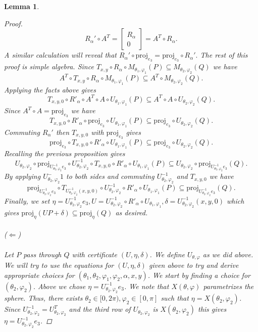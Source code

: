 \documentclass[a4paper]{amsart}
\newtheorem{lem}[thm]{Lemma}
\renewcommand{\phi}{\varphi}
\theoremstyle{remark}
\begin{document}
\begin{lem}
\begin{proof}
$$R_\alpha '\circ A^T=\begin{bmatrix} R_\alpha \\ 0\end{bmatrix}=A^T\circ R_\alpha.$$
A similar calculation will reveal that $R_\alpha'\circ \textrm{proj}_{e_3}=\textrm{proj}_{e_3}\circ R_\alpha'.$
The rest of this proof is simple algebra. Since $T_{x,y}\circ R_\alpha\circ M_{\theta_1,\phi_1}(P)\subseteq M_{\theta_2,\phi_2}(Q)$ we have $$A^T\circ T_{x,y}\circ R_\alpha\circ M_{\theta_1,\phi_1}(P)\subseteq A^T\circ M_{\theta_2,\phi_2}(Q).$$ Applying the facts above gives $$T_{x,y,0}\circ R'_\alpha\circ A^T\circ A\circ U_{\theta_1,\phi_1}(P)\subseteq A^T\circ A\circ U_{\theta_2,\varphi_2}(Q).$$ Since $A^T\circ A=\textrm{proj}_{e_3}$ we have $$T_{x,y,0}\circ R'_\alpha\circ \textrm{proj}_{e_3}\circ U_{\theta_1,\phi_1}(P)\subseteq \textrm{proj}_{e_3} \circ U_{\theta_2,\varphi_2}(Q).$$ Commuting $R_\alpha'$ then $T_{x,y,0}$ with $\textrm{proj}_{e_3}$ gives $$\textrm{proj}_{e_3}\circ T_{x,y,0}\circ R'_\alpha \circ U_{\theta_1,\phi_1}(P)\subseteq \textrm{proj}_{e_3} \circ U_{\theta_2,\varphi_2}(Q).$$ Recalling the previous proposition gives $$U_{\theta_2,\phi_2}\circ \textrm{proj}_{U_{\theta_2,\phi_2}^{-1}e_3}\circ U_{\theta_2,\phi_2}^{-1}\circ T_{x,y,0}\circ R'_\alpha \circ U_{\theta_1,\phi_1}(P)\subseteq U_{\theta_2,\phi_2}\circ \textrm{proj}_{U_{\theta_2,\phi_2}^{-1}e_3} (Q).$$ By applying $U_{\theta_2,\phi_2}^-1$ to both sides and commuting $U_{\theta_2,\phi_2}^{-1}$ and $T_{x,y,0}$ we have
$$\textrm{proj}_{U_{\theta_2,\phi_2}^{-1}e_3}\circ T_{U_{\theta_2,\phi_2}^{-1}(x,y,0)}\circ U_{\theta_2,\phi_2}^{-1}\circ R'_\alpha \circ U_{\theta_1,\phi_1}(P)\subseteq \textrm{proj}_{U_{\theta_2,\phi_2}^{-1}e_3} (Q).$$ Finally, we set $\eta=U_{\theta_2,\phi_2}^{-1}e_3,U=U_{\theta_2,\phi_2}^{-1}\circ R'_\alpha \circ U_{\theta_1,\phi_1},\delta=U_{\theta_2,\phi_2}^{-1}(x,y,0)$ which gives $\textrm{proj}_\eta(UP+\delta)\subseteq \textrm{proj}_\eta(Q)$ as desired.
\\\\
($\Longleftarrow$)
\\\\
Let $P$ pass through $Q$ with certificate $(U,\eta,\delta)$. We define $U_{\theta,\phi}$ as we did above. We will try to use the equations for $(U,\eta,\delta)$ given above to try and derive appropriate choices for $(\theta_1,\theta_2,\phi_1,\phi_2,\alpha,x,y)$. We start by finding a choice for $(\theta_2,\phi_2)$. Above we chose $\eta=U^{-1}_{\theta_2,\phi_2}e_3$. We note that $X(\theta,\phi)$ parametrizes the sphere. Thus, there exists $\theta_2\in[0,2\pi),\phi_2\in[0,\pi]$ such that $\eta=X(\theta_2,\phi_2)$. Since $U^{-1}_{\theta_2,\phi_2}=U^T_{\theta_2,\phi_2}$ and the third row of $U_{\theta_2,\phi_2}$ is $X(\theta_2,\phi_2)$ this gives $\eta=U^{-1}_{\theta_2,\phi_2}e_3$.

\end{proof}
\end{lem}
\end{document}
